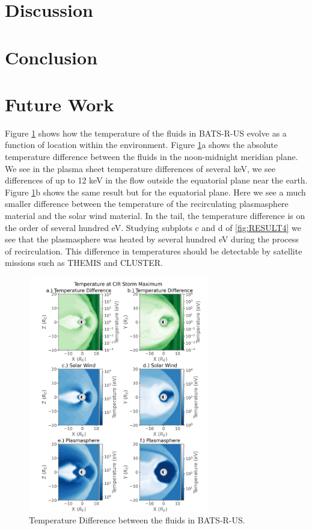 \documentclass[utf8]{frontiersinFPHY_FAMS}
\begin{document}
\section{Discussion}

\section{Conclusion}

\section{Future Work}

Figure \ref{fig:RESULT5} shows how the temperature of the fluids in BATS-R-US evolve as a function of location within the environment. Figure \ref{fig:RESULT5}a shows the absolute temperature difference between the fluids in the noon-midnight meridian plane. We see in the plasma sheet temperature differences of several keV, we see differences of up to 12 keV in the flow outside the equatorial plane near the earth. Figure \ref{fig:RESULT5}b shows the same result but for the equatorial plane. Here we see a much smaller difference between the temperature of the recirculating plasmasphere material and the solar wind material. In the tail, the temperature difference is on the order of several hundred eV. Studying subplots c and d of \ref{fig:RESULT4} we see that the plasmasphere was heated by several hundred eV during the process of recirculation. This difference in temperatures should be detectable by satellite missions such as THEMIS and CLUSTER. 

\begin{figure}[!ht]
\begin{center}
    \includegraphics[width=0.7\textwidth]{Temp_Diff_Storm_Maximum.png}
    \caption{Temperature Difference between the fluids in BATS-R-US.}
    \label{fig:RESULT5}
\end{center}
\end{figure}
\end{document}
